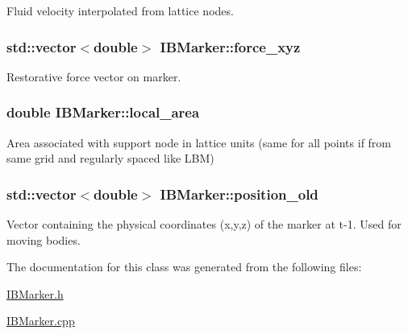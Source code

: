 Fluid velocity interpolated from lattice nodes. 

\subsubsection[{\texorpdfstring{force\+\_\+xyz}{force_xyz}}]{\setlength{\rightskip}{0pt plus 5cm}std\+::vector$<$double$>$ I\+B\+Marker\+::force\+\_\+xyz\hspace{0.3cm}{\ttfamily [protected]}}\hypertarget{class_i_b_marker_aa8b8b23e64a8bfc4051b95ebf9ccb767}{}\label{class_i_b_marker_aa8b8b23e64a8bfc4051b95ebf9ccb767}


Restorative force vector on marker. 

\subsubsection[{\texorpdfstring{local\+\_\+area}{local_area}}]{\setlength{\rightskip}{0pt plus 5cm}double I\+B\+Marker\+::local\+\_\+area\hspace{0.3cm}{\ttfamily [protected]}}\hypertarget{class_i_b_marker_aa332dcba1676eae4fbb6d0fa6caca809}{}\label{class_i_b_marker_aa332dcba1676eae4fbb6d0fa6caca809}


Area associated with support node in lattice units (same for all points if from same grid and regularly spaced like L\+BM) 

\subsubsection[{\texorpdfstring{position\+\_\+old}{position_old}}]{\setlength{\rightskip}{0pt plus 5cm}std\+::vector$<$double$>$ I\+B\+Marker\+::position\+\_\+old\hspace{0.3cm}{\ttfamily [protected]}}\hypertarget{class_i_b_marker_a6a55fe2293f288ae339036ea4a3bc7df}{}\label{class_i_b_marker_a6a55fe2293f288ae339036ea4a3bc7df}


Vector containing the physical coordinates (x,y,z) of the marker at t-\/1. Used for moving bodies. 



The documentation for this class was generated from the following files\+:\begin{DoxyCompactItemize}
\item 
\hyperlink{_i_b_marker_8h}{I\+B\+Marker.\+h}\item 
\hyperlink{_i_b_marker_8cpp}{I\+B\+Marker.\+cpp}\end{DoxyCompactItemize}
